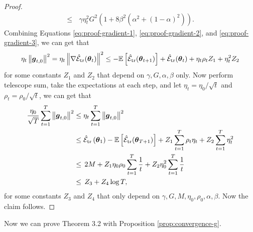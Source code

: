 \begin{proof}
\begin{equation}
\begin{aligned}
            \le & \, \gamma\eta_t^2G^2(1 + 8\beta^2(\alpha^2 + (1- \alpha)^2)).
        \end{aligned}
    \end{equation}
    Combining Equations \eqref{eq:proof-gradient-1}, \eqref{eq:proof-gradient-2}, and \eqref{eq:proof-gradient-3}, we can get that
    \begin{equation}
        \eta_t \left\|\boldsymbol{g}_{t,0}\right\|^2 = \eta_t \left\|\nabla \hat{\mathcal{E}}_{{\text{tr}}}(\boldsymbol{\theta}_t)\right\|^2 \le -\mathbb{E}\left[\hat{\mathcal{E}}_{{\text{tr}}}(\boldsymbol{\theta}_{t+1})\right] + \hat{\mathcal{E}}_{{\text{tr}}}(\boldsymbol{\theta}_t) + \eta_t\rho_t Z_1 + \eta_t^2 Z_2 
    \end{equation}
    for some constants $Z_1$ and $Z_2$ that depend on $\gamma, G, \alpha, \beta$ only. Now perform telescope sum, take the expectations at each step, and let $\eta_t = \eta_0 / \sqrt{t}$ and $\rho_t = \rho_0 / \sqrt{t}$, we can get that
    \begin{equation}
        \begin{aligned}
            \frac{\eta_0}{\sqrt{T}}\sum_{t=1}^T \left\|\boldsymbol{g}_{t,0}\right\|^2 & \le \eta_t\sum_{t=1}^T \left\|\boldsymbol{g}_{t,0}\right\|^2 \\
            & \le \hat{\mathcal{E}}_{{\text{tr}}}\left(\boldsymbol{\theta}_1\right) - \mathbb{E}\left[\hat{\mathcal{E}}_{{\text{tr}}}(\boldsymbol{\theta}_{T+1})\right] + Z_1\sum_{t=1}^T \rho_t\eta_t + Z_2 \sum_{t=1}^T \eta_t^2 \\
            & \le \, 2M + Z_1\eta_0\rho_0 \sum_{t=1}^T \frac{1}{t} + Z_2 \eta_0^2\sum_{t=1}^T \frac{1}{t} \\
            & \le \, Z_3 + Z_4 \log T,
        \end{aligned}
    \end{equation}
    for some constants $Z_3$ and $Z_4$ that only depend on $\gamma, G, M, \eta_0, \rho_0, \alpha, \beta$. Now the claim follows.
\end{proof}

Now we can prove Theorem 3.2 with Proposition \ref{prop:convergence-g}.

